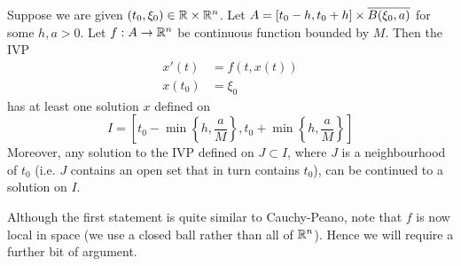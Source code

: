 \begin{theorem}
Suppose we are given $(t_0, \xi_0) \in \mathbb{R} \times \mathbb{R}^n$. Let $A = [t_0 - h, t_0 + h] \times \overline{B(\xi_0, a)}$ for some $h, a > 0$. Let $f: A \to \mathbb{R}^n$ be continuous function bounded by $M$. Then the IVP
\begin{align*}
    x'(t) &= f(t, x(t))\\
    x(t_0) &= \xi_0
\end{align*}
has at least one solution $x$ defined on
$$ I = [t_0 - \min\left\{h, \frac{a}{M}\right\}, t_0 + \min\left\{h, \frac{a}{M}\right\}] $$
Moreover, any solution to the IVP defined on $J \subset I$, where $J$ is a neighbourhood of $t_0$ (i.e. $J$ contains an open set that in turn contains $t_0$), can be continued to a solution on $I$.
\end{theorem}
\begin{remark}
Although the first statement is quite similar to Cauchy-Peano, note that $f$ is now local in space (we use a closed ball rather than all of $\mathbb{R}^n$). Hence we will require a further bit of argument.
\end{remark}
